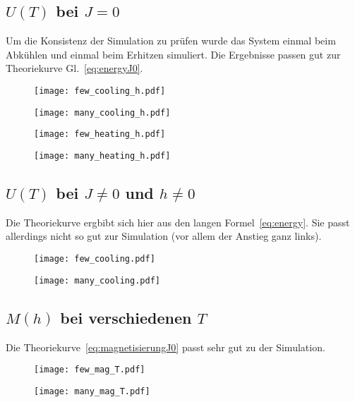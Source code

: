 		\subsection{$U\left(T\right)$ bei $J=0$}
		Um die Konsistenz der Simulation zu prüfen wurde das System einmal beim Abkühlen und einmal beim Erhitzen simuliert. Die Ergebnisse passen gut zur Theoriekurve Gl.~\eqref{eq:energyJ0}.
		\begin{figure}[ht]
				\centering
				\texttt{[image: few\_cooling\_h.pdf]}
		\end{figure}
		\begin{figure}[ht]
				\centering
				\texttt{[image: many\_cooling\_h.pdf]}
		\end{figure}
		\begin{figure}[ht]
				\centering
				\texttt{[image: few\_heating\_h.pdf]}
		\end{figure}
		\begin{figure}[ht]
				\centering
				\texttt{[image: many\_heating\_h.pdf]}
		\end{figure}
		\FloatBarrier{}

		\subsection{$U\left(T\right)$ bei $J\neq 0$ und $h\neq 0$}
		Die Theoriekurve ergbibt sich hier aus den langen Formel~\eqref{eq:energy}. Sie passt allerdings nicht so gut zur Simulation (vor allem der Anstieg ganz links).
		\begin{figure}[ht]
				\centering
				\texttt{[image: few\_cooling.pdf]}
		\end{figure}
		\begin{figure}[ht]
				\centering
				\texttt{[image: many\_cooling.pdf]}
		\end{figure}
		\FloatBarrier{}

		\subsection{$M\left(h\right)$ bei verschiedenen $T$}
		Die Theoriekurve~\eqref{eq:magnetisierungJ0} passt sehr gut zu der Simulation.
		\begin{figure}[ht]
				\centering
				\texttt{[image: few\_mag\_T.pdf]}
		\end{figure}
		\begin{figure}[ht]
				\centering
				\texttt{[image: many\_mag\_T.pdf]}
		\end{figure}
		\FloatBarrier{}

